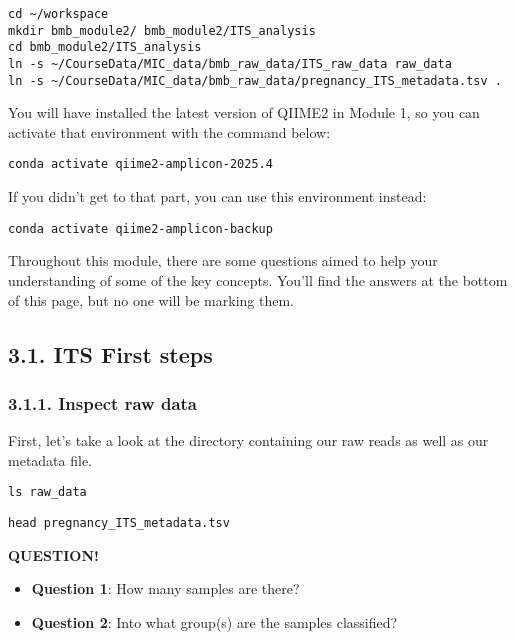 \documentclass[
]{book}
\providecommand{\tightlist}{%
  \setlength{\itemsep}{0pt}\setlength{\parskip}{0pt}}
\newenvironment{bluebox}{
  \definecolor{shadecolor}{RGB}{172, 210, 237}
  \color{white}
  \begin{shaded}}
 {\end{shaded}}
\begin{document}
\begin{verbatim}
cd ~/workspace
mkdir bmb_module2/ bmb_module2/ITS_analysis
cd bmb_module2/ITS_analysis
ln -s ~/CourseData/MIC_data/bmb_raw_data/ITS_raw_data raw_data
ln -s ~/CourseData/MIC_data/bmb_raw_data/pregnancy_ITS_metadata.tsv .
\end{verbatim}

You will have installed the latest version of QIIME2 in Module 1, so you can activate that environment with the command below:

\begin{verbatim}
conda activate qiime2-amplicon-2025.4
\end{verbatim}

If you didn't get to that part, you can use this environment instead:

\begin{verbatim}
conda activate qiime2-amplicon-backup
\end{verbatim}

Throughout this module, there are some questions aimed to help your understanding of some of the key concepts. You'll find the answers at the bottom of this page, but no one will be marking them.

\subsection{3.1. ITS First steps}\label{its-first-steps}

\subsubsection{3.1.1. Inspect raw data}\label{inspect-raw-data-2}

First, let's take a look at the directory containing our raw reads as well as our metadata file.

\begin{verbatim}
ls raw_data
\end{verbatim}

\begin{verbatim}
head pregnancy_ITS_metadata.tsv
\end{verbatim}

\begin{bluebox}

\begin{center}
\textbf{QUESTION!}

\end{center}

\begin{itemize}
\tightlist
\item
  \textbf{Question 1}: How many samples are there?
\item
  \textbf{Question 2}: Into what group(s) are the samples classified?
\end{itemize}

\end{bluebox}
\end{document}

